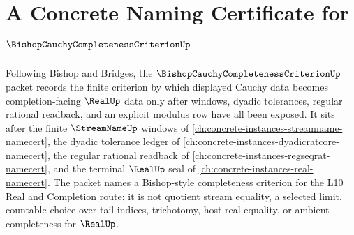 \chapter{A Concrete Naming Certificate for $\BishopCauchyCompletenessCriterionUp$}
\label{ch:concrete-instances-bishop-cauchy-completeness-criterion-namecert}

Following Bishop and Bridges, the $\BishopCauchyCompletenessCriterionUp$ packet records the finite criterion by which displayed Cauchy data becomes completion-facing $\RealUp$ data only after windows, dyadic tolerances, regular rational readback, and an explicit modulus row have all been exposed. It sits after the finite $\StreamNameUp$ windows of \autoref{ch:concrete-instances-streamname-namecert}, the dyadic tolerance ledger of \autoref{ch:concrete-instances-dyadicratcore-namecert}, the regular rational readback of \autoref{ch:concrete-instances-regseqrat-namecert}, and the terminal $\RealUp$ seal of \autoref{ch:concrete-instances-real-namecert}. The packet names a Bishop-style completeness criterion for the L10 Real and Completion route; it is not quotient stream equality, a selected limit, countable choice over tail indices, trichotomy, host real equality, or ambient completeness for $\RealUp$.

